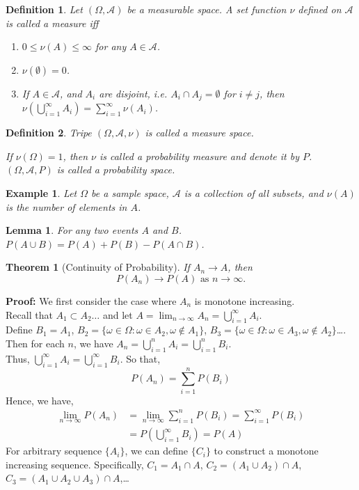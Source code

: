\documentclass[11pt]{article}
\def\MA{{\mathcal A}}
\newtheorem{theorem}{Theorem}[section]
\newtheorem{lemma}{Lemma}[section]
\newtheorem{definition}{Definition}[section]
\newtheorem{example}{Example}[section]
\begin{document}
\begin{definition}
Let $(\Omega, \MA)$ be a measurable space. A set function $\nu$ defined on $\MA$ is called a measure iff
\begin{enumerate}
\item $0 \leq \nu(A) \leq \infty$ for any $A \in \MA$.
\item $\nu(\emptyset) = 0$.
\item If $A \in \MA$, and $A_i$ are disjoint, i.e. $A_i \cap A_j = \emptyset$ for $i \neq j$,
then $\nu(\bigcup_{i=1}^\infty A_i) = \sum_{i=1}^\infty \nu(A_i)$.
\end{enumerate}
\end{definition}

\begin{definition}
Tripe $(\Omega, \MA, \nu)$ is called a measure space.

If $\nu(\Omega) = 1$, then $\nu$ is called a probability measure and denote it by $P$.
$(\Omega, \MA, P)$ is called a probability space.
\end{definition}

\begin{example}
Let $\Omega$ be a sample space, $\MA$ is a collection of all subsets, and $\nu(A)$ is the number of elements in $A$.
\end{example}

\begin{lemma}
For any two events $A$ and $B$. $P(A \cup B) = P(A) + P(B) - P(A \cap B)$.
\end{lemma}

\begin{theorem}[Continuity of Probability]
If $A_n \rightarrow A$, then
\[ P(A_n) \rightarrow P(A) \text{ as } n\rightarrow \infty. \]
\end{theorem}
{\bf Proof: } We first consider the case where $A_n$ is monotone increasing.\\
Recall that $A_1\subset A_2\dots$ and let $A = \lim_{n\rightarrow \infty}A_n = \bigcup_{i = 1}^{\infty}A_i$.\\
Define $B_1 = A_1$, $B_2 = \{ \omega \in \Omega : \omega \in A_2, \omega \notin A_1\}$,
$B_3 = \{ \omega \in \Omega : \omega \in A_3, \omega \notin A_2\}$\dots.
Then for each $n$, we have $A_n = \bigcup_{i=1}^{n}A_i = \bigcup_{i=1}^{n}B_i$.\\
Thus, $\bigcup_{i=1}^{\infty}A_i = \bigcup_{i=1}^{\infty}B_i$. So that,
\[P(A_n) = \sum_{i=1}^n P(B_i)\]
Hence, we have,
\begin{align}\nonumber
\lim_{n\rightarrow\infty}P(A_n) & = \lim_{n\rightarrow\infty}\sum_{i=1}^n P(B_i) = \sum_{i=1}^{\infty}P(B_i)\\
& = P(\bigcup_{i=1}^{\infty}B_i) = P(A)\nonumber
\end{align}
For arbitrary sequence $\{A_i\}$, we can define $\{C_i\}$ to construct a monotone increasing sequence.
Specifically,
$C_1 = A_1 \cap A$,
$C_2 = (A_1 \cup A_2) \cap A$,
$C_3 = (A_1 \cup A_2 \cup A_3) \cap A$,\dots
\end{document}
